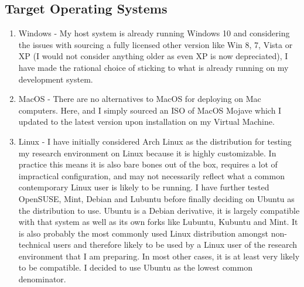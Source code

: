 \documentclass{article}
\begin{document}
\subsection{Target Operating Systems}
\begin{enumerate}
    \item Windows - My host system is already running Windows 10 and considering the issues with  sourcing a fully licensed other version like Win 8, 7, Vista or XP (I would not consider anything older as even XP is now depreciated), I have made the rational choice of sticking to what is already running on my development system.
    \item MacOS - There are no alternatives to MacOS for deploying on Mac computers. Here, and I simply sourced an ISO of MacOS Mojave which I updated to the latest version upon installation on my Virtual Machine.
    \item Linux - I have initially considered Arch Linux as the distribution for testing my research environment on Linux because it is highly customizable. In practice this means it is also bare bones out of the box, requires a lot of impractical configuration, and may not necessarily reflect what a common contemporary Linux user is likely to be running. I have further tested OpenSUSE, Mint, Debian and Lubuntu before finally deciding on Ubuntu as the distribution to use. Ubuntu is a Debian derivative, it is largely compatible with that system as well as its own forks like Lubuntu, Kubuntu and Mint. It is also probably the most commonly used Linux distribution amongst non-technical users and therefore likely to be used by a Linux user of the research environment that I am preparing. In most other cases, it is at least very likely to be compatible. I decided to use Ubuntu as the lowest common denominator.
\end{enumerate}
\end{document}
